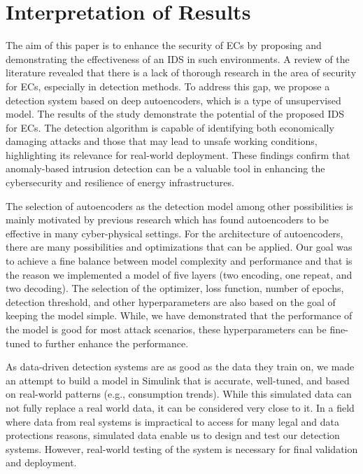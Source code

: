 \section{Interpretation of Results}

The aim of this paper is to enhance the security of ECs by proposing and demonstrating the effectiveness of an IDS in such environments. A review of the literature revealed that there is a lack of thorough research in the area of security for ECs, especially in detection methods. To address this gap, we propose a detection system based on deep autoencoders, which is a type of unsupervised model. The results of the study demonstrate the potential of the proposed IDS for ECs. The detection algorithm is capable of identifying both economically damaging attacks and those that may lead to unsafe working conditions, highlighting its relevance for real-world deployment. These findings confirm that anomaly-based intrusion detection can be a valuable tool in enhancing the cybersecurity and resilience of energy infrastructures.

The selection of autoencoders as the detection model among other possibilities is mainly motivated by previous research which has found autoencoders to be effective in many cyber-physical settings. For the architecture of autoencoders, there are many possibilities and optimizations that can be applied. Our goal was to achieve a fine balance between model complexity and performance and that is the reason we implemented a model of five layers (two encoding, one repeat, and two decoding). The selection of the optimizer, loss function, number of epochs, detection threshold, and other hyperparameters are also based on the goal of keeping the model simple. While, we have demonstrated that the performance of the model is good for most attack scenarios, these hyperparameters can be fine-tuned to further enhance the performance. 

As data-driven detection systems are as good as the data they train on, we made an attempt to build a model in Simulink that is accurate, well-tuned, and based on real-world patterns (e.g., consumption trends). While this simulated data can not fully replace a real world data, it can be considered very close to it. In a field where data from real systems is impractical to access for many legal and data protections reasons, simulated data enable us to design and test our detection systems. However, real-world testing of the system is necessary for final validation and deployment. 

